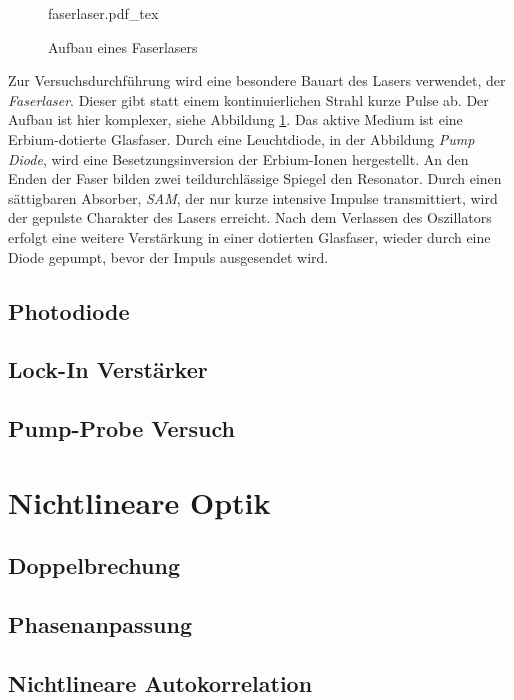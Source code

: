 \begin{figure}
  \centering
  {faserlaser.pdf_tex}
  \caption{Aufbau eines Faserlasers}
  \label{abb:faser}
\end{figure}
Zur Versuchsdurchführung wird eine besondere Bauart des Lasers verwendet, der 
\emph{Faserlaser}. Dieser gibt statt einem kontinuierlichen Strahl kurze Pulse ab.
Der Aufbau ist hier komplexer, siehe Abbildung \ref{abb:faser}.
Das aktive Medium ist eine Erbium-dotierte Glasfaser. Durch eine Leuchtdiode, in der
Abbildung \emph{Pump Diode}, wird eine Besetzungsinversion der Erbium-Ionen
hergestellt. An den Enden der Faser bilden zwei teildurchlässige Spiegel den 
Resonator. Durch einen sättigbaren Absorber, \emph{SAM}, der nur kurze intensive
Impulse transmittiert, wird der gepulste Charakter des Lasers erreicht. Nach dem 
Verlassen des Oszillators erfolgt eine weitere Verstärkung in einer dotierten 
Glasfaser, wieder durch eine Diode gepumpt, bevor der Impuls ausgesendet wird. 
\autocite{phying, zinth}

    \subsection{Photodiode}


    \subsection{Lock-In Verstärker}


    \subsection{Pump-Probe Versuch}

\section{Nichtlineare Optik}
    \subsection{Doppelbrechung}

    \subsection{Phasenanpassung}

    \subsection{Nichtlineare Autokorrelation}

